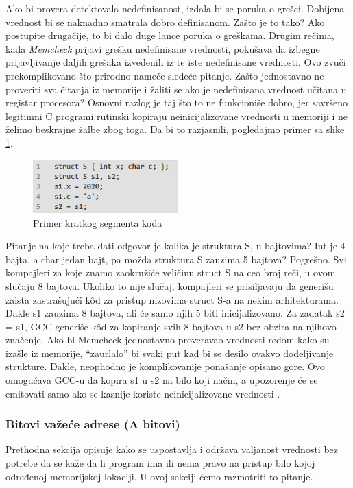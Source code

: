\documentclass[12pt,oneside]{memoir}
\theoremstyle{plain}
\theoremstyle{definition}
\begin{document}
Ako bi provera detektovala nedefinisanost, izdala bi se poruka o grešci. Dobijena vrednost bi se naknadno smatrala dobro definisanom. Zašto je to tako? Ako postupite drugačije, to bi dalo duge lance poruka o greškama. Drugim rečima, kada \textit{Memcheck} prijavi grešku nedefinisane vrednosti, pokušava da izbegne prijavljivanje daljih grešaka izvedenih iz te iste nedefinisane vrednosti. Ovo zvuči prekomplikovano što prirodno nameće sledeće pitanje. Zašto jednostavno ne proveriti sva čitanja iz memorije i žaliti se ako je nedefinisana vrednost učitana u registar procesora? Osnovni razlog je taj što to ne funkcioniše dobro, jer savršeno legitimni C programi rutinski kopiraju neinicijalizovane vrednosti u memoriji i ne želimo beskrajne žalbe zbog toga. Da bi to razjasnili, pogledajmo primer sa slike \ref{fig:slika2.2}.
\begin{figure}[!ht]
  \centering
  \includegraphics[width=0.5\textwidth]{picture2.2.png}
  \caption{Primer kratkog segmenta koda}
  \label{fig:slika2.2}
\end{figure}

Pitanje na koje treba dati odgovor je kolika je struktura S, u bajtovima? Int je 4 bajta, a char jedan bajt, pa možda struktura S zauzima 5 bajtova? Pogrešno. Svi kompajleri za koje znamo zaokružiće veličinu struct S na ceo broj reči, u ovom slučaju 8 bajtova. Ukoliko to nije slučaj, kompajleri  se prisiljavaju da generišu zaista zastrašujući k\^od za pristup nizovima struct S-a na nekim arhitekturama. Dakle s1 zauzima 8 bajtova, ali će samo njih 5 biti inicijalizovano. Za zadatak s2 = s1, GCC generiše k\^od za kopiranje svih 8 bajtova u s2 bez obzira na njihovo značenje. Ako bi Memcheck jednostavno proveravao vrednosti redom kako su izašle iz memorije, “zaurlalo”  bi svaki put kad bi se desilo ovakvo dodeljivanje strukture. Dakle, neophodno je komplikovanije ponašanje opisano gore. Ovo omogućava GCC-u da kopira s1 u s2 na bilo koji način, a upozorenje će se emitovati samo ako se kasnije koriste neinicijalizovane vrednosti \cite{Memcheck}. 

\subsubsection{Bitovi važeće adrese (A bitovi)}
Prethodna sekcija opisuje kako se uspostavlja i održava valjanost vrednosti bez potrebe da se kaže da li program ima ili nema pravo na pristup bilo kojoj određenoj memorijskoj lokaciji. U ovoj sekciji ćemo razmotriti to pitanje.
\end{document}
